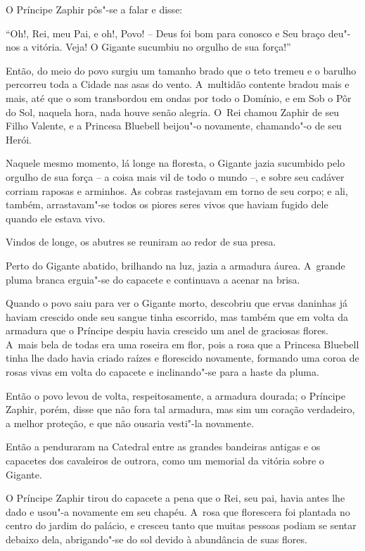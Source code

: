 O Príncipe Zaphir pôs"-se a falar e disse:

``Oh!, Rei, meu Pai, e oh!, Povo! -- Deus foi bom para conosco e Seu
braço deu"-nos a vitória. Veja! O Gigante sucumbiu no orgulho de sua
força!''

Então, do meio do povo surgiu um tamanho brado que o teto tremeu
e o barulho percorreu toda a Cidade nas asas do vento. A~multidão contente bradou mais e mais, até que o som transbordou em ondas
por todo o Domínio, e em Sob o Pôr do Sol, naquela hora, nada houve senão
alegria. O~Rei chamou Zaphir de seu Filho Valente, e a Princesa Bluebell
beijou"-o novamente, chamando"-o de seu Herói.

Naquele mesmo momento, lá longe na floresta, o Gigante jazia sucumbido
pelo orgulho de sua força -- a coisa mais vil de todo o mundo --, e
sobre seu cadáver corriam raposas e arminhos. As cobras rastejavam em
torno de seu corpo; e ali, também, arrastavam"-se todos os piores seres
vivos que haviam fugido dele quando ele estava vivo.

Vindos de longe, os abutres se reuniram ao redor de sua presa.

Perto do Gigante abatido, brilhando na luz, jazia a armadura áurea. A~grande pluma branca erguia"-se do capacete e continuava a acenar na
brisa.

Quando o povo saiu para ver o Gigante morto, descobriu que ervas
daninhas já haviam crescido onde seu sangue tinha escorrido, mas também
que em volta da armadura que o Príncipe despiu havia crescido um anel de
graciosas flores. A~mais bela de todas era uma roseira em
flor, pois a rosa que a Princesa Bluebell tinha lhe dado havia criado
raízes e florescido novamente, formando uma coroa de rosas vivas em
volta do capacete e inclinando"-se para a haste da pluma.

Então o povo levou de volta, respeitosamente, a armadura dourada; o
Príncipe Zaphir, porém, disse que não fora tal armadura, mas sim um
coração verdadeiro, a melhor proteção, e que não ousaria vesti"-la
novamente.

Então a penduraram na Catedral entre as grandes bandeiras antigas e os
capacetes dos cavaleiros de outrora, como um memorial da vitória sobre o
Gigante.

O Príncipe Zaphir tirou do capacete a pena que o Rei, seu pai, havia
antes lhe dado e usou"-a novamente em seu chapéu. A~rosa que florescera
foi plantada no centro do jardim do palácio, e cresceu tanto que muitas
pessoas podiam se sentar debaixo dela, abrigando"-se do sol devido à abundância de
suas flores.


